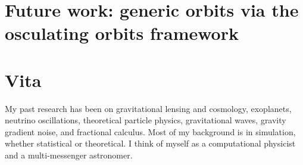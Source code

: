 \documentclass[12pt,letterpaper]{lsuetd}
\begin{document}
\chapter{Future work: generic orbits via the osculating orbits framework}
\doublespacing

\label{futurework}
\pagebreak
\singlespacing
\begin{thebibliography}{999}
\vspace{0.9em}

\end{thebibliography}
%
%

\chapter*{Vita}
\doublespacing
\setlength{\parindent}{1.75em}
\vspace{0.2em}
My past research has been on gravitational lensing and cosmology, exoplanets, neutrino oscillations, theoretical particle physics, gravitational waves, gravity gradient noise, and fractional calculus. Most of my background is in simulation, whether statistical or theoretical. I think of myself as a computational physicist and a multi-messenger astronomer. 
\end{document}
